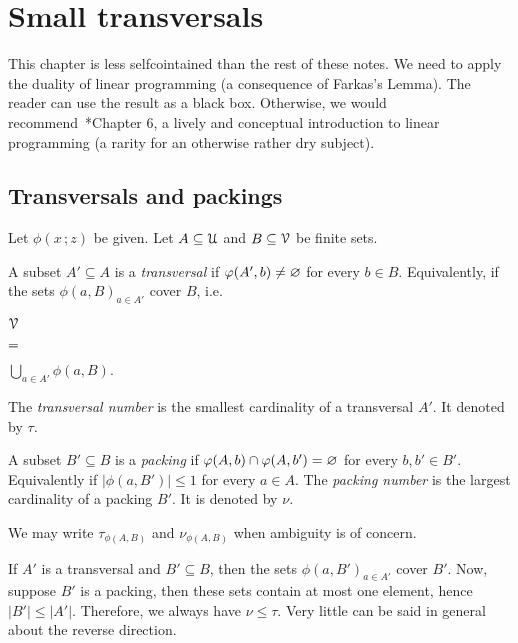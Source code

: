 \documentclass[scombinatorics.tex]{subfiles}
\begin{document}
\chapter{Small transversals}
\label{fractional}

\def\medrel#1{\parbox[t]{5ex}{$\displaystyle\hfil #1$}}
\def\ceq#1#2#3{\parbox[t]{23ex}{$\displaystyle #1$}\medrel{#2}{$\displaystyle #3$}}

This chapter is less selfcointained than the rest of these notes.
We need to apply the duality of linear programming (a consequence of Farkas's Lemma).
The reader can use the result as a black box.
Otherwise, we would recommend~\cite{LPmatousek}*{Chapter 6}, a lively and conceptual introduction to linear programming (a rarity for an otherwise rather dry subject).

\section{Transversals and packings}\label{Transversals_Packings}

Let $\phi(x\,;z)$ be given. 
Let $A\subseteq\EuScript U$ and $B\subseteq\EuScript V$ be finite sets. 

A subset $A'\subseteq A$ is a \emph{transversal\/} if $\varphi(A',b)\neq\varnothing$ for every $b\in B$. Equivalently, if the sets $\phi(a,B)_{a\in A'}$ cover $B$, i.e.

\ceq{\hfill\V}
{=}
{\bigcup_{a\in A'}\phi(a,B).}

The \emph{transversal number\/} is the smallest cardinality of a transversal $A'$.
It denoted by \emph{$\tau$.} 

A subset $B'\subseteq B$ is a \emph{packing\/} if $\varphi(A,b)\cap\varphi(A,b')=\varnothing$ for every $b,b'\in B'$. Equivalently if $|\phi(a,B')|\le1$ for every $a\in A$.
The \emph{packing number\/} is the largest cardinality of a packing $B'$.
It is denoted by \emph{$\nu$.}

We may write \emph{$\tau_{\phi(A,B)}$} and  \emph{$\nu_{\phi(A,B)}$} when ambiguity is of concern. 

If $A'$ is a transversal and $B'\subseteq B$, then the sets $\phi(a,B')_{a\in A'}$ cover $B'$.
Now, suppose $B'$ is a packing, then these sets contain at most one element, hence $|B'|\le|A'|$.
Therefore, we always have $\nu\le\tau$.
Very little can be said in general about the reverse direction.
\end{document}
